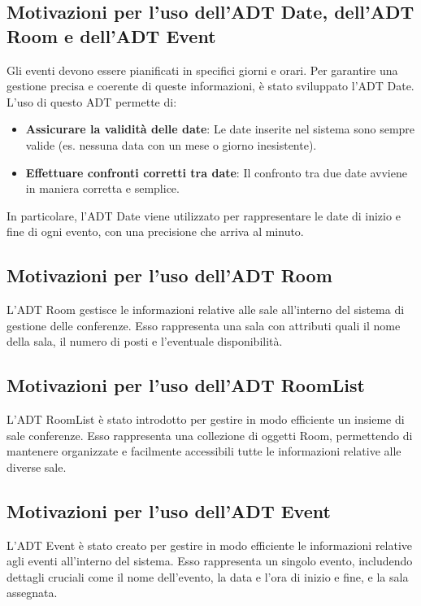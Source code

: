 \documentclass[11pt]{scrartcl} %
\begin{document}
\subsection{Motivazioni per l'uso dell'ADT Date, dell'ADT Room e dell'ADT Event}

Gli eventi devono essere pianificati in specifici giorni e orari. Per garantire una gestione precisa e coerente di queste informazioni, è stato sviluppato l'ADT Date. L'uso di questo ADT permette di:
\begin{itemize}
	\item \textbf{Assicurare la validità delle date}: Le date inserite nel sistema sono sempre valide (es. nessuna data con un mese o giorno inesistente).
	\item \textbf{Effettuare confronti corretti tra date}: Il confronto tra due date avviene in maniera corretta e semplice.
\end{itemize}
In particolare, l'ADT Date viene utilizzato per rappresentare le date di inizio e fine di ogni evento, con una precisione che arriva al minuto.

\subsection{Motivazioni per l'uso dell'ADT Room}

L'ADT Room gestisce le informazioni relative alle sale all'interno del sistema di gestione delle conferenze. Esso rappresenta una sala con attributi quali il nome della sala, il numero di posti e l'eventuale disponibilità.

\subsection{Motivazioni per l'uso dell'ADT RoomList}

L'ADT RoomList è stato introdotto per gestire in modo efficiente un insieme di sale conferenze. Esso rappresenta una collezione di oggetti Room, permettendo di mantenere organizzate e facilmente accessibili tutte le informazioni relative alle diverse sale.

\subsection{Motivazioni per l'uso dell'ADT Event}

L'ADT Event è stato creato per gestire in modo efficiente le informazioni relative agli eventi all'interno del sistema. Esso rappresenta un singolo evento, includendo dettagli cruciali come il nome dell'evento, la data e l'ora di inizio e fine, e la sala assegnata.
\end{document}
